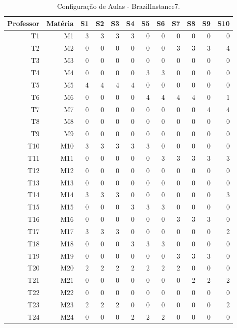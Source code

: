 \begin{table}[h]
	\centering
	\caption[Configuração de Aulas das turmas S1 a S10 - BrazilInstance7]{Configuração de Aulas - BrazilInstance7.
		\label{tab:config_aulas_br7}}
	\begin{tabular}{rrrrrrrrrrrr}
		\toprule
		Professor & Matéria & S1 & S2 & S3 & S4 & S5 & S6 & S7 & S8 & S9 & S10 \\
		\midrule
		T1 & M1 & 3 & 3 & 3 & 3 & 0 & 0 & 0 & 0 & 0 & 0 \\
		T2 & M2 & 0 & 0 & 0 & 0 & 0 & 0 & 3 & 3 & 3 & 4 \\
		T3 & M3 & 0 & 0 & 0 & 0 & 0 & 0 & 0 & 0 & 0 & 0 \\
		T4 & M4 & 0 & 0 & 0 & 0 & 3 & 3 & 0 & 0 & 0 & 0 \\
		T5 & M5 & 4 & 4 & 4 & 4 & 0 & 0 & 0 & 0 & 0 & 0 \\
		T6 & M6 & 0 & 0 & 0 & 0 & 4 & 4 & 4 & 4 & 0 & 1 \\
		T7 & M7 & 0 & 0 & 0 & 0 & 0 & 0 & 0 & 0 & 4 & 4 \\
		T8 & M8 & 0 & 0 & 0 & 0 & 0 & 0 & 0 & 0 & 0 & 0 \\
		T9 & M9 & 0 & 0 & 0 & 0 & 0 & 0 & 0 & 0 & 0 & 0 \\
		T10 & M10 & 3 & 3 & 3 & 3 & 3 & 0 & 0 & 0 & 0 & 0 \\
		T11 & M11 & 0 & 0 & 0 & 0 & 0 & 3 & 3 & 3 & 3 & 3 \\
		T12 & M12 & 0 & 0 & 0 & 0 & 0 & 0 & 0 & 0 & 0 & 0 \\
		T13 & M13 & 0 & 0 & 0 & 0 & 0 & 0 & 0 & 0 & 0 & 0 \\
		T14 & M14 & 3 & 3 & 3 & 0 & 0 & 0 & 0 & 0 & 0 & 3 \\
		T15 & M15 & 0 & 0 & 0 & 3 & 3 & 3 & 0 & 0 & 0 & 0 \\
		T16 & M16 & 0 & 0 & 0 & 0 & 0 & 0 & 3 & 3 & 3 & 0 \\
		T17 & M17 & 3 & 3 & 3 & 0 & 0 & 0 & 0 & 0 & 0 & 2 \\
		T18 & M18 & 0 & 0 & 0 & 3 & 3 & 3 & 0 & 0 & 0 & 0 \\
		T19 & M19 & 0 & 0 & 0 & 0 & 0 & 0 & 3 & 3 & 3 & 0 \\
		T20 & M20 & 2 & 2 & 2 & 2 & 2 & 2 & 2 & 0 & 0 & 0 \\
		T21 & M21 & 0 & 0 & 0 & 0 & 0 & 0 & 0 & 2 & 2 & 2 \\
		T22 & M22 & 0 & 0 & 0 & 0 & 0 & 0 & 0 & 0 & 0 & 0 \\
		T23 & M23 & 2 & 2 & 2 & 0 & 0 & 0 & 0 & 0 & 0 & 2 \\
		T24 & M24 & 0 & 0 & 0 & 2 & 2 & 2 & 0 & 0 & 0 & 0 \\

\end{tabular}
\end{table}
